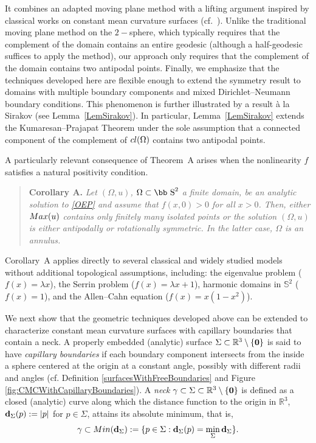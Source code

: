 \documentclass[11pt]{article}
\def\s{\hbox{\bb S}}
\newcommand{\set}[1]{\left\{#1\right\}}
\numberwithin{equation} {section}
\begin{document}
It combines an adapted moving plane method with a lifting argument inspired by classical works on constant mean curvature surfaces (cf.~\cite{Me}). Unlike the traditional moving plane method on the $2-$sphere, which typically requires that the complement of the domain contains an entire geodesic \cite{KP} (although a half-geodesic suffices to apply the method), our approach only requires that the complement of the domain contains two antipodal points. Finally, we emphasize that the techniques developed here are flexible enough to extend the symmetry result to domains with multiple boundary components and mixed Dirichlet–Neumann boundary conditions. This phenomenon is further illustrated by a result \`a la Sirakov \cite{Sir} (see Lemma~\ref{LemSirakov}). In particular, Lemma~\ref{LemSirakov} extends the Kumaresan--Prajapat Theorem \cite{KP} under the sole assumption that a connected component of the complement of $\textup{cl}(\Omega)$ contains two antipodal points.

A particularly relevant consequence of Theorem~A arises when the nonlinearity
$f$ satisfies a natural positivity condition.

\begin{quote}\label{CorThA}
{\bf Corollary A.} {\it Let $(\Omega, u)$, $\Omega \subset \s^2$ a finite domain, be an analytic solution to \eqref{OEP} and assume that $f(x,0)>0$ for all $x>0$. Then, either $\textup{Max}(u)$ contains only finitely many isolated points or the solution $(\Omega ,u)$ is either antipodally or rotationally symmetric. In the latter case, $\Omega$ is an annulus.}
\end{quote}

Corollary~A applies directly to several classical and widely studied models without additional topological assumptions, including:
the eigenvalue problem ($f(x)=\lambda x$), the Serrin problem ($f(x)=\lambda x+1$), harmonic domains in $\mathbb{S}^2$ ($f(x)=1$), and the Allen--Cahn equation ($f(x)=x(1-x^2)$). 

We next show that the geometric techniques developed above can be extended to characterize constant mean curvature surfaces with capillary boundaries that contain a neck. A properly embedded (analytic) surface \(\Sigma \subset \mathbb{R}^3 \setminus \set{\bf 0}\) is said to have \textit{capillary boundaries} if each boundary component intersects from the inside a sphere centered at the origin at a constant angle, possibly with different radii and angles (cf. Definition \ref{surfacesWithFreeBoundaries} and Figure \ref{fig:CMCWithCapillaryBoundaries}). A {\it neck} $\gamma\subset\Sigma \subset \mathbb{R}^3 \setminus \set{\bf 0}$ is defined as a closed (analytic) curve along which the distance function to the origin in $\mathbb{R}^3$, 
${\bf d}_\Sigma(p):=|p|$ for $p\in\Sigma$, attains its absolute minimum, that is,
\[
\gamma\subset{\rm Min}({\bf d}_\Sigma):=\{p\in\Sigma : {\bf d}_\Sigma(p)=\min_\Sigma {\bf d}_\Sigma\}.
\]
\end{document}

